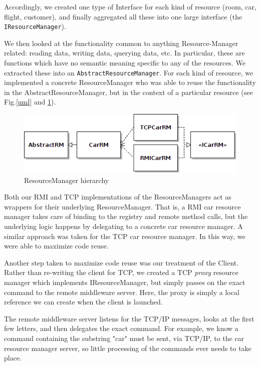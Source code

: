\documentclass[a4paper]{article}
\begin{document}
Accordingly, we created one type of Interface for each kind of resource (room, car, flight, customer), and finally aggregated all these into one large interface (the \texttt{IResourceManager}). 


We then looked at the functionality common to anything Resource-Manager related: reading data, writing data, querying data, etc. In particular,
these are functions which have no semantic meaning specific to any of the resources. We extracted these into an \texttt{AbstractResourceManager}.
For each kind of resource, we implemented a concrete ResourceManager who was able to reuse the functionality in the AbstractResourceManager, but in the context of a particular resource (see Fig.\ref{uml} and \ref{carrm}).

 
\begin{figure}[h!]
  \centering
	\includegraphics[scale=0.6]{carrm.png}
  \caption{ResourceManager hierarchy}
  \label{carrm}
\end{figure}

Both our RMI and TCP implementations of the ResourceManagers act as wrappers for their underlying ResourceManager. That is, a RMI car resource manager
takes care of binding to the registry and remote method calls, but the underlying logic happens by delegating to a concrete car resource manager. A
similar approach was taken for the TCP car resource manager. In this way, we were able to maximize code reuse. 


Another step taken to maximize code reuse was our treatment of the Client. Rather than re-writing the client for TCP, we created a TCP \emph{proxy} resource
manager which implements IResourceManager, but simply passes on the exact command to the remote middleware server. Here, the proxy is simply a local reference we can create when the client is launched.


The remote middleware server listens for the TCP/IP messages, looks at the first few letters, and then delegates the exact command. For example, we know a command containing the substring "car" must be sent, via TCP/IP, to the car resource manager server, so little processing of the commands ever needs to take place. 
\end{document}
